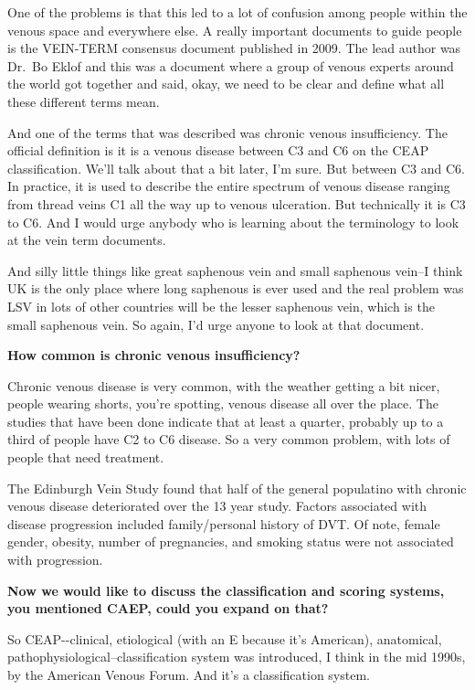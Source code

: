 \documentclass[
]{book}
\begin{document}
One of the problems is that this led to a lot of confusion among people
within the venous space and everywhere else. A really important
documents to guide people is the VEIN-TERM consensus document published
in 2009.\citep{eklof2009} The lead author was Dr.~Bo Eklof and this was a
document where a group of venous experts around the world got together
and said, okay, we need to be clear and define what all these different
terms mean.

And one of the terms that was described was chronic venous
insufficiency. The official definition is it is a venous disease between
C3 and C6 on the CEAP classification. We'll talk about that a bit later,
I'm sure. But between C3 and C6. In practice, it is used to describe the
entire spectrum of venous disease ranging from thread veins C1 all the
way up to venous ulceration. But technically it is C3 to C6. And I would
urge anybody who is learning about the terminology to look at the vein
term documents.\citep{eklöf2004, eklof2009}

And silly little things like great saphenous vein and small saphenous
vein--I think UK is the only place where long saphenous is ever used and
the real problem was LSV in lots of other countries will be the lesser
saphenous vein, which is the small saphenous vein. So again, I'd urge
anyone to look at that document.

\textbf{How common is chronic venous insufficiency?}

Chronic venous disease is very common, with the weather getting a bit
nicer, people wearing shorts, you're spotting, venous disease all over
the place. The studies that have been done indicate that at least a
quarter, probably up to a third of people have C2 to C6 disease. So a
very common problem, with lots of people that need treatment.

The Edinburgh Vein Study found that half of the general populatino with
chronic venous disease deteriorated over the 13 year study. Factors
associated with disease progression included family/personal history of
DVT. Of note, female gender, obesity, number of pregnancies, and smoking
status were not associated with progression.\citep{lee2015}

\textbf{Now we would like to discuss the classification and scoring systems,
you mentioned CAEP, could you expand on that?}

So CEAP-\/-clinical, etiological (with an E because it's American),
anatomical, pathophysiological--classification system was introduced, I
think in the mid 1990s, by the American Venous Forum. And it's a
classification system.
\end{document}
